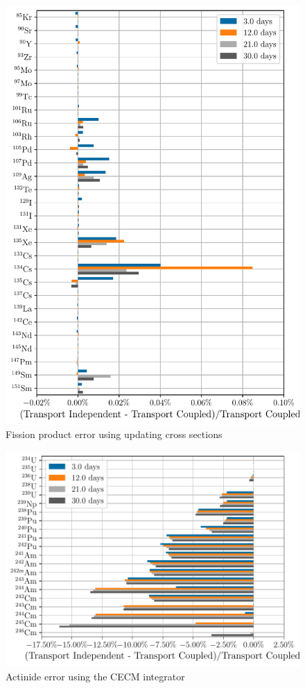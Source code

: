     \begin{figure}[htpb]
        \centering
        \includegraphics[width=\linewidth]{figs/fission_products_updating_xs_predictor_fission_q_days.pdf}
        \caption{Fission product error using  updating cross sections}
        \label{fig:fp-error-updating-xs}
    \end{figure}

    \begin{figure}[htpb]
        \centering
        \includegraphics[width=\linewidth]{figs/actinides_constant_xs_cecm_fission_q_days.pdf}
        \caption{Actinide error using the CECM integrator}
        \label{fig:actinides-error-cecm}
    \end{figure}


